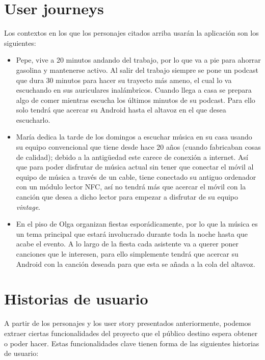 \section{User journeys}
Los contextos en los que los personajes citados arriba usarán la aplicación son
los siguientes:\\

\begin{itemize}
    \item Pepe, vive a 20 minutos andando del trabajo, por lo que va a
    pie para ahorrar gasolina y mantenerse activo. Al salir del trabajo siempre
    se pone un podcast que dura 30 minutos para hacer su trayecto más ameno, el
    cual lo va escuchando en sus auriculares inalámbricos. Cuando llega a casa
    se prepara algo de comer mientras escucha los últimos minutos de su podcast.
    Para ello solo tendrá que acercar su Android hasta el altavoz en el que
    desea escucharlo.
    \item María dedica la tarde de los domingos a escuchar música en su casa
    usando su equipo convencional que tiene desde hace 20 años (cuando
    fabricaban cosas de calidad); debido a la antigüedad este carece de conexión
    a internet. Así que para poder disfrutar de música actual sin tener que
    conectar el móvil al equipo de música a través de un cable, tiene conectado
    su antiguo ordenador con un módulo lector NFC, así no tendrá más que acercar el
    móvil con la canción que desea a dicho lector para empezar a disfrutar de su
    equipo \emph{vintage}.
    \item En el piso de Olga organizan fiestas esporádicamente, por lo que la
    música es un tema principal que estará involucrado durante toda la noche hasta que
    acabe el evento. A lo largo de la fiesta cada asistente va a querer poner
    canciones que le interesen, para ello simplemente tendrá que acercar su
    Android con la canción deseada para que esta se añada a la cola del altavoz.
\end{itemize}


\section{Historias de usuario}
A partir de los personajes y los user story presentados anteriormente, podemos
extraer ciertas funcionalidades del proyecto que el público destino espera
obtener o poder hacer. Estas funcionalidades clave tienen forma de las
siguientes historias de usuario:


